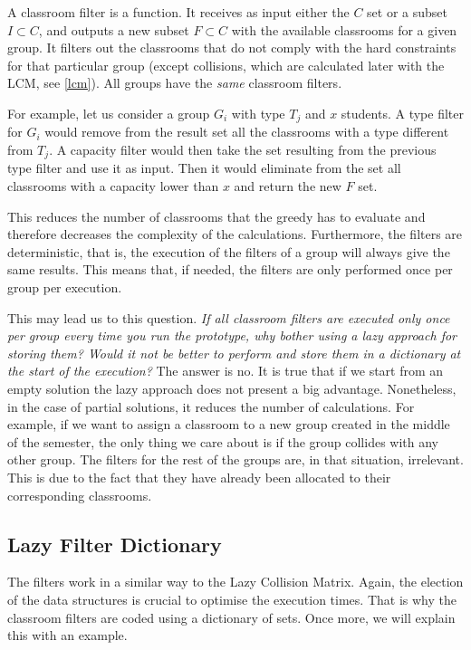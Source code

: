A classroom filter is a function. It receives as input either the $C$ set or a subset $I \subset C$, and outputs a new subset $F \subset C$ with the available classrooms for a given group. It filters out the classrooms that do not comply with the hard constraints for that particular group (except collisions, which are calculated later with the LCM, see \ref{lcm}). All groups have the \textit{same} classroom filters.

For example, let us consider a group $G_{i}$ with type $T_{j}$ and $x$ students. A type filter for $G_{i}$ would remove from the result set all the classrooms with a type different from $T_{j}$. A capacity filter would then take the  set resulting from the previous type filter and use it as input. Then it would eliminate from the set all classrooms with a capacity lower than $x$ and return the new $F$ set.

This reduces the number of classrooms that the greedy has to evaluate and therefore decreases the complexity of the calculations. Furthermore, the filters are deterministic, that is, the execution of the filters of a group will always give the same results. This means that, if needed, the filters are only performed once per group per execution.

This may lead us to this question. \textit{If all classroom filters are executed only once per group every time you run the prototype, why bother using a lazy approach for storing them? Would it not be better to perform and store them in a dictionary at the start of the execution?} The answer is no. It is true that if we start from an empty solution the lazy approach does not present a big advantage. Nonetheless, in the case of partial solutions, it reduces the number of calculations. For example, if we want to assign a classroom to a new group created in the middle of the semester, the only thing we care about is if the group collides with any other group. The filters for the rest of the groups are, in that situation, irrelevant. This is due to the fact that they have already been allocated to their corresponding classrooms.


\subsection{Lazy Filter Dictionary}\label{lfd}

The filters work in a similar way to the Lazy Collision Matrix. Again, the election of the data structures is crucial to optimise the execution times. That is why the classroom filters are coded using a dictionary of sets. Once more, we will explain this with an example.

